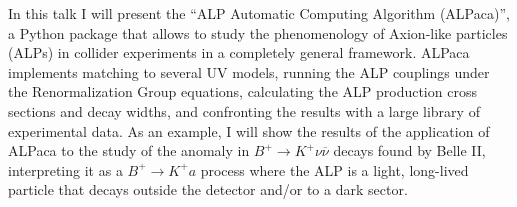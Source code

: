 \documentclass[combined.tex]{subfiles}
\begin{document}
In this talk I will present the ``ALP Automatic Computing Algorithm (ALPaca)'', a Python package that allows to study the phenomenology of Axion-like particles (ALPs) in collider experiments in a completely general framework. ALPaca implements matching to several UV models, running the ALP couplings under the Renormalization Group equations, calculating the ALP production cross sections and decay widths, and confronting the results with a large library of experimental data. As an example, I will show the results of the application of ALPaca to the study of the anomaly in $B^+\to K^+ \nu \overline{\nu}$ decays found by Belle II, interpreting it as a $B^+\to K^+ a$ process where the ALP is a light, long-lived particle that decays outside the detector and/or to a dark sector.
\end{document}
